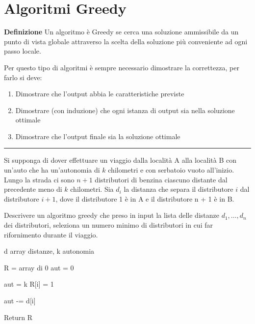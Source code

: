 \documentclass{article}
\begin{document}
\section{Algoritmi Greedy}

\textbf{Definizione} Un algoritmo è Greedy se cerca una soluzione ammissibile da un punto
di vista globale attraverso la scelta della soluzione più conveniente ad ogni passo
locale.\newline

\noindent Per questo tipo di algoritmi è sempre necessario dimostrare la correttezza, per farlo si deve:
\begin{enumerate}
    \item Dimostrare che l'output abbia le caratteristiche previste
    \item Dimostrare (con induzione) che ogni istanza di output sia nella soluzione ottimale
    \item Dimostrare che l'output finale sia la soluzione ottimale
\end{enumerate}

\noindent\rule{\textwidth}{0.5pt}

\noindent Si supponga di dover effettuare un viaggio dalla località A alla località B con un'auto che ha un’autonomia di $k$ chilometri e con serbatoio vuoto all'inizio. Lungo la strada ci sono $n + 1$ distributori di benzina ciascuno distante dal precedente meno di $k$ chilometri. Sia $d_i$ la distanza che separa il distributore $i$ dal distributore $i + 1$, dove il distributore 1 è in A e il distributore n + 1 è in B. \newline

\noindent Descrivere un algoritmo greedy che preso in input la lista delle distanze $d_1,\ldots,d_n$ dei distributori, seleziona un numero minimo di distributori in cui far rifornimento durante il viaggio.

\begin{algorithm}[ht]
    \caption{}
    \begin{algorithmic}

        \State d array distanze, k autonomia
    
        \State
        \State R = array di 0
        \State aut = 0


                \State aut = k
                \State R[i] = 1
            
            \EndIf

            \State aut -= d[i]
            
        \EndFor

        \State Return R
        
    \end{algorithmic}
\end{algorithm}
\end{document}
